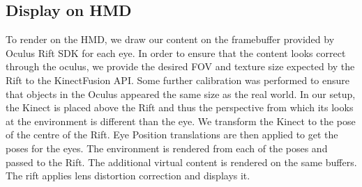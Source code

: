 \subsection{Display on HMD}
To render on the HMD, we draw our content on the framebuffer provided by Oculus Rift SDK for each eye. In order to ensure that the content looks correct through the oculus, we provide the desired FOV and texture size expected by the Rift to the KinectFusion API. Some further calibration was performed to ensure that objects in the Oculus appeared the same size as the real world. In our setup, the Kinect is placed above the Rift and thus the perspective from which its looks at the environment is different than the eye. We transform the Kinect to the pose of the centre of the Rift. Eye Position translations are then applied to get the poses for the eyes. The environment is rendered from each of the poses and passed to the Rift. The additional virtual content is rendered on the same buffers. The rift applies lens distortion correction and displays it.